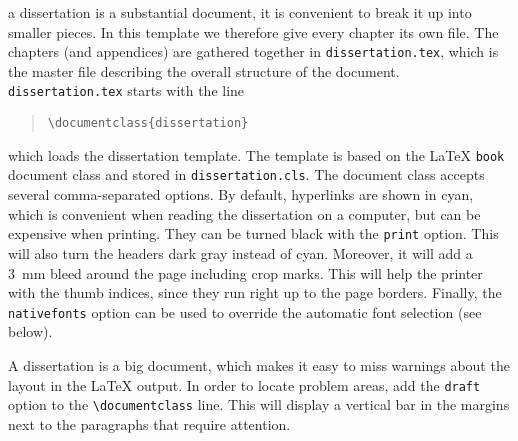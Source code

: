  a dissertation is a substantial document, it is convenient to break it up into smaller pieces. In this template we therefore give every chapter its own file. The chapters (and appendices) are gathered together in \texttt{dissertation.tex}, which is the master file describing the overall structure of the document. \texttt{dissertation.tex} starts with the line

\begin{quote}
\texttt{\textbackslash documentclass\{dissertation\}}
\end{quote}
which loads the dissertation template. The template is based on the \LaTeX{} \texttt{book} document class and stored in \texttt{dissertation.cls}. The document class accepts several comma-separated options. By default, hyperlinks are shown in cyan, which is convenient when reading the dissertation on a computer, but can be expensive when printing. They can be turned black with the \texttt{print} option. This will also turn the headers dark gray instead of cyan. Moreover, it will add a 3~mm bleed around the page including crop marks. This will help the printer with the thumb indices, since they run right up to the page borders. Finally, the \texttt{nativefonts} option can be used to override the automatic font selection (see below).

A dissertation is a big document, which makes it easy to miss warnings about the layout in the \LaTeX{} output. In order to locate problem areas, add the \texttt{draft} option to the \texttt{\textbackslash documentclass} line. This will display a vertical bar in the margins next to the paragraphs that require attention.

